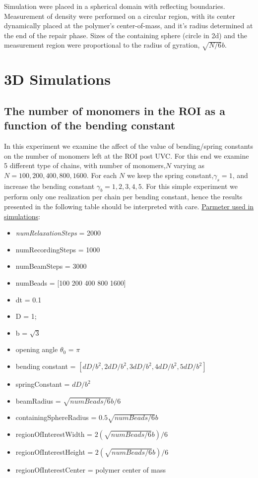 \documentclass[12pt]{report}
\begin{document}
	Simulation were placed in a spherical domain with reflecting boundaries.
	Measurement of density were performed on a circular region, with its center dynamically placed at the polymer's center-of-mass, and it's radius determined at the end of the repair phase.
	Sizes of the containing sphere (circle in 2d) and the measurement region were proportional to the radius of gyration, $\sqrt{N/6}b$.
	
	\section{3D Simulations}
	 \subsection{The number of monomers in the ROI as a function of the bending constant}
	  In this experiment we examine the affect of the value of bending/spring constants on the number of monomers left at the ROI post UVC. 
	  For this end we examine 5 different type of chains, with number of monomers,$N$ varying as $N=100, 200, 400, 800,1600$. For each $N$ we keep the spring constant,$\gamma_s=1$, and increase the bending constant $\gamma_b= 1,2,3,4,5$. For this simple experiment we perform only one realization per chain per bending constant, hence the results presented in the following table should be interpreted  with care. 
	  \underline{Parmeter used in simulations}:
	  
	  \begin{itemize}
	  	\item \textit{numRelaxationSteps} = 2000
	  	\item numRecordingSteps  = 1000
	  	\item numBeamSteps       = 3000
	  	\item numBeads = [100 200 400 800 1600]
	  	\item dt       = 0.1
	  	\item D        = 1;
	  	\item b        = $\sqrt{3}$
	  	\item opening angle $\theta_0$ = $\pi$
	  	\item bending constant = $[dD/b^2, 2dD/b^2,3dD/b^2,4dD/b^2, 5dD/b^2]$
	  	\item springConstant   = $dD/b^2$
	  	\item beamRadius = $\sqrt{numBeads/6}b/6$
	  	\item containingSphereRadius = $0.5\sqrt{numBeads/6}b$
	  	\item regionOfInterestWidth  = $2(\sqrt{numBeads/6}b)/6$
	  	\item regionOfInterestHeight = $2(\sqrt{numBeads/6}b)/6$
	  	\item regionOfInterestCenter = polymer center of mass
	  \end{itemize}
	  
\end{document}
